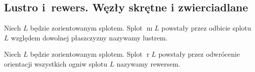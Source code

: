 
\subsection{Lustro i~rewers. Węzły skrętne i zwierciadlane}
\begin{definition}[lustro]
%
    Niech $L$ będzie zorientowanym splotem.
    Splot $\operatorname{m} L$ powstały przez odbicie splotu $L$ względem dowolnej płaszczyzny nazywamy lustrem.
\end{definition}

\begin{definition}[rewers]
%
%
    Niech $L$ będzie zorientowanym splotem.
    Splot $\operatorname{r} L$ powstały przez odwrócenie orientacji wszystkich ogniw splotu $L$ nazywamy rewersem.
\end{definition}

